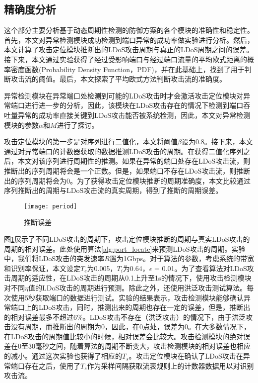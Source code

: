 \subsection{精确度分析}
\label{chap5:accuracy}
这个部分主要分析基于动态周期性检测的防御方案的各个模块的准确性和稳定性。首先，本文对异常检测模块成功检测到端口异常的成功率做实验进行分析。然后，本文计算了攻击定位模块推断出的LDoS攻击周期与真正的LDoS周期之间的误差。接下来，本文通过实验获得了经过受影响端口与经过端口流量的平均欧式距离的概率密度函数(Probability Density Function，PDF)，并在此基础上，找到了用于判断攻击流的阈值。最后，本文探索了平均欧式方法判断攻击流的准确度。

异常检测模块在异常端口处检测到可能的LDoS攻击时才会激活攻击定位模块对异常端口进行进一步的分析，因此，该模块在LDoS攻击存在的情况下检测到端口吞吐量异常的成功率直接关键到LDoS攻击能否被系统检测，因此，本文对异常检测模块的参数$\alpha$和$M$进行了探讨。





攻击定位模块的第一步是对序列进行二值化，本文将阈值$\beta$设为0.8。接下来，本文通过对异常端口的计数器获取的数据推测LDoS攻击的周期。在获得二值化序列之后，本文对该序列进行周期性的推测。如果在异常的端口处存在LDoS攻击流，则推断出的序列周期将会是一个正数。但是，如果端口不存在LDoS攻击流，则推断出的序列周期将会为0。为了获得攻击定位模块推断的周期准确度，本文比较通过序列推断出的周期与LDoS攻击流的真实周期，得到了推断的周期误差。

\begin{figure}
    \centering
    \texttt{[image: period]}
    \caption{推断误差}
    \label{fig:period}
\end{figure}

图\ref{fig:period}展示了不同LDoS攻击的周期下，攻击定位模块推断的周期与真实LDoS攻击的周期的相对误差。此处使用算法\ref{alg:port_locate}来预测LDoS攻击的周期。实验中，我们将LDoS攻击的突发速率$R$置为1Gbps。对于算法的参数，考虑系统的带宽和识别率保证，本文设定$T_e$为0.005，$T_i$为0.64，$\epsilon$ = 0.01。为了查看算法对LDoS攻击周期的适应性，在LDoS攻击的周期从0.1上升至1s的情况下，使用攻击检测模块对不同$\eta$值的LDoS攻击的周期进行预测。除此之外，还使用洪泛攻击测试算法。每次使用5秒获取端口的数据进行测试。实验的结果表示，攻击检测模块能够确认异常端口上的LDoS攻击，同时，推测出来的周期也存在一定的误差，但是，推断出的相对误差最多不超过6\%。LDoS攻击不存在（洪泛攻击）的情况下，由于洪泛攻击没有周期，而推断出的周期为0，因此，在0点处，误差为0。在大多数情况下，在LDoS攻击的周期值比较小的时候，相对误差会比较大。攻击检测模块的绝对误差在0至30毫秒之间，随着算法的周期不断变大，攻击检测模块的相对误差也相应的减小。通过这次实验也获得了相应的$T_s$。攻击定位模块在确认了LDoS攻击在异常端口存在之后，使用了$T_s$作为采样间隔获取流表规则上的计数器数据用以对识别攻击流。

